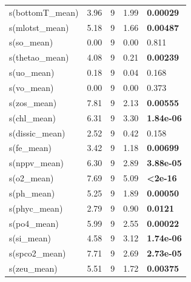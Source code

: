 \documentclass[a4paper,fleqn]{cas-sc}
\begin{document}
\begin{table}[width=\linewidth,cols=5,pos=h]
\begin{tabular*}{\tblwidth}{@{} LLLLL @{}}
s(bottomT\_mean) & 3.96 & 9 & 1.99  & \textbf{0.00029} \\
s(mlotst\_mean)   & 5.18 & 9 & 1.66  & \textbf{0.00487} \\
s(so\_mean)       & 0.00 & 9 & 0.00  & 0.811 \\
s(thetao\_mean)   & 4.08 & 9 & 0.21  & \textbf{0.00239} \\
s(uo\_mean)       & 0.18 & 9 & 0.04  & 0.168 \\
s(vo\_mean)       & 0.00 & 9 & 0.00  & 0.373 \\
s(zos\_mean)      & 7.81 & 9 & 2.13  & \textbf{0.00555} \\
s(chl\_mean)      & 6.31 & 9 & 3.30  & \textbf{1.84e-06} \\
s(dissic\_mean)   & 2.52 & 9 & 0.42  & 0.158 \\
s(fe\_mean)       & 3.42 & 9 & 1.18  & \textbf{0.00699} \\
s(nppv\_mean)     & 6.30 & 9 & 2.89  & \textbf{3.88e-05} \\
s(o2\_mean)       & 7.69 & 9 & 5.09  & \textbf{<2e-16} \\
s(ph\_mean)       & 5.25 & 9 & 1.89  & \textbf{0.00050} \\
s(phyc\_mean)     & 2.79 & 9 & 0.90  & \textbf{0.0121} \\
s(po4\_mean)      & 5.99 & 9 & 2.55  & \textbf{0.00022} \\
s(si\_mean)       & 4.58 & 9 & 3.12  & \textbf{1.74e-06} \\
s(spco2\_mean)    & 7.71 & 9 & 2.69  & \textbf{2.73e-05} \\
s(zeu\_mean)      & 5.51 & 9 & 1.72  & \textbf{0.00375} \\
\bottomrule
\end{tabular*}
\label{tab:7}
\end{table}
\FloatBarrier
\end{document}
